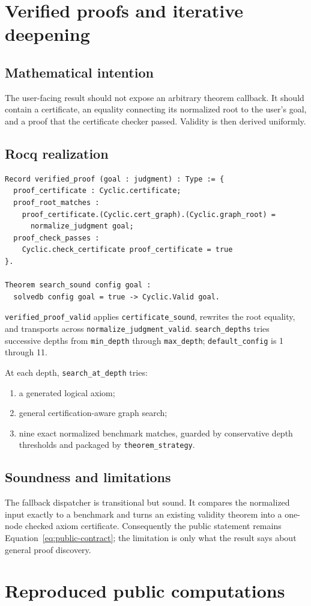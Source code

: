 \documentclass[11pt,oneside]{book}
\DeclareRobustCommand{\code}[1]{\nolinkurl{#1}}
\newcommand{\mathintent}{\subsection*{Mathematical intention}}
\newcommand{\rocqreal}{\subsection*{Rocq realization}}
\newcommand{\soundlim}{\subsection*{Soundness and limitations}}
\begin{document}
\section{Verified proofs and iterative deepening}

\mathintent

The user-facing result should not expose an arbitrary theorem callback.  It
should contain a certificate, an equality connecting its normalized root to
the user's goal, and a proof that the certificate checker passed.  Validity is
then derived uniformly.

\rocqreal

\begin{lstlisting}[caption={The public proof-carrying result and soundness contract.}]
Record verified_proof (goal : judgment) : Type := {
  proof_certificate : Cyclic.certificate;
  proof_root_matches :
    proof_certificate.(Cyclic.cert_graph).(Cyclic.graph_root) =
      normalize_judgment goal;
  proof_check_passes :
    Cyclic.check_certificate proof_certificate = true
}.

Theorem search_sound config goal :
  solvedb config goal = true -> Cyclic.Valid goal.
\end{lstlisting}
\code{verified_proof_valid} applies \code{certificate_sound}, rewrites the
root equality, and transports across \code{normalize_judgment_valid}.
\code{search_depths} tries successive depths from \code{min_depth} through
\code{max_depth}; \code{default_config} is 1 through 11.

At each depth, \code{search_at_depth} tries:
\begin{enumerate}[leftmargin=*]
\item a generated logical axiom;
\item general certification-aware graph search;
\item nine exact normalized benchmark matches, guarded by conservative depth
thresholds and packaged by \code{theorem_strategy}.
\end{enumerate}

\soundlim

The fallback dispatcher is transitional but sound.  It compares the normalized
input exactly to a benchmark and turns an existing validity theorem into a
one-node checked axiom certificate.  Consequently the public statement remains
Equation~\eqref{eq:public-contract}; the limitation is only what the result says
about general proof discovery.

\section{Reproduced public computations}
\end{document}
